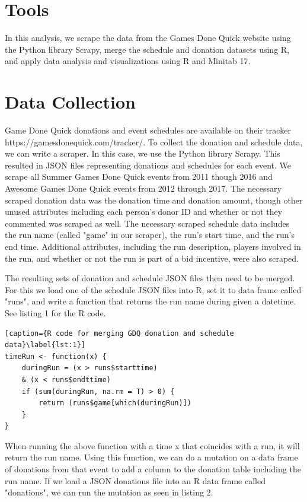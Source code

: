 \documentclass[journal]{IEEEtran}
\begin{document}
\section {Tools}

In this analysis, we scrape the data from the Games Done Quick website using the Python library Scrapy, merge the schedule and donation datasets using R, and apply data analysis and visualizations using R\cite{R} and Minitab 17\cite{Minitab}.

\section{Data Collection}

Game Done Quick donations and event schedules are available on their tracker https://gamesdonequick.com/tracker/. To collect the donation and schedule data, we can write a scraper. In this case, we use the Python\cite{python} library Scrapy\cite{scrapy}. This resulted in JSON files representing donations and schedules for each event. We scrape all Summer Games Done Quick events from 2011 though 2016 and Awesome Games Done Quick events from 2012 through 2017. The necessary scraped donation data was the donation time and donation amount, though other unused attributes including each person's donor ID and whether or not they commented was scraped as well. The necessary scraped schedule data includes the run name (called "game" in our scraper), the run's start time, and the run's end time. Additional attributes, including the run description, players involved in the run, and whether or not the run is part of a bid incentive, were also scraped.

The resulting sets of donation and schedule JSON files then need to be merged. For this we load one of the schedule JSON files into R, set it to data frame called "runs", and write a function that returns the run name during given a datetime. See listing 1 for the R code.

\begin{lstlisting}[caption={R code for merging GDQ donation and schedule data}\label{lst:1}]
timeRun <- function(x) {
    duringRun = (x > runs$starttime)
    & (x < runs$endttime)
    if (sum(duringRun, na.rm = T) > 0) {
        return (runs$game[which(duringRun)])
    }
}
\end{lstlisting}

When running the above function with a time x that coincides with a run, it will return the run name. Using this function, we can do a mutation on a data frame of donations from that event to add a column to the donation table including the run name. If we load a JSON donations file into an R data frame called "donations", we can run the mutation as seen in listing 2.
\end{document}
